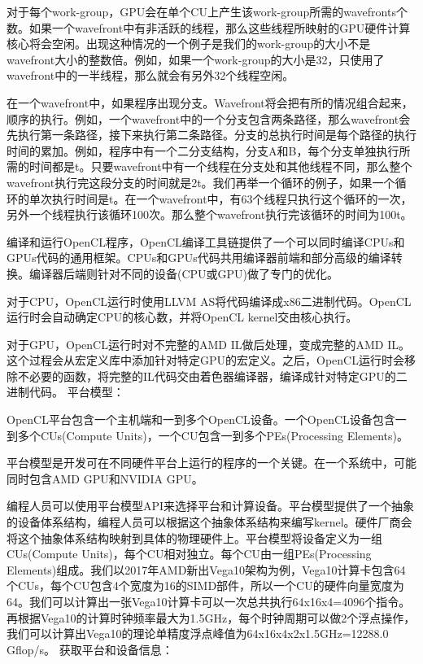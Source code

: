 对于每个work-group，GPU会在单个CU上产生该work-group所需的wavefronts个数。如果一个wavefront中有非活跃的线程，那么这些线程所映射的GPU硬件计算核心将会空闲。出现这种情况的一个例子是我们的work-group的大小不是wavefront大小的整数倍。例如，如果一个work-group的大小是32，只使用了wavefront中的一半线程，那么就会有另外32个线程空闲。

在一个wavefront中，如果程序出现分支。Wavefront将会把有所的情况组合起来，顺序的执行。例如，一个wavefront中的一个分支包含两条路径，那么wavefront会先执行第一条路径，接下来执行第二条路径。分支的总执行时间是每个路径的执行时间的累加。例如，程序中有一个二分支结构，分支A和B，每个分支单独执行所需的时间都是t。只要wavefront中有一个线程在分支处和其他线程不同，那么整个wavefront执行完这段分支的时间就是2t。我们再举一个循环的例子，如果一个循环的单次执行时间是t。在一个wavefront中，有63个线程只执行这个循环的一次，另外一个线程执行该循环100次。那么整个wavefront执行完该循环的时间为100t。

编译和运行OpenCL程序，OpenCL编译工具链提供了一个可以同时编译CPUs和GPUs代码的通用框架。CPUs和GPUs代码共用编译器前端和部分高级的编译转换。编译器后端则针对不同的设备(CPU或GPU)做了专门的优化。

对于CPU，OpenCL运行时使用LLVM AS将代码编译成x86二进制代码。OpenCL运行时会自动确定CPU的核心数，并将OpenCL kernel交由核心执行。

对于GPU，OpenCL运行时对不完整的AMD IL做后处理，变成完整的AMD IL。这个过程会从宏定义库中添加针对特定GPU的宏定义。之后，OpenCL运行时会移除不必要的函数，将完整的IL代码交由着色器编译器，编译成针对特定GPU的二进制代码。
平台模型：

OpenCL平台包含一个主机端和一到多个OpenCL设备。一个OpenCL设备包含一到多个CUs(Compute Units)，一个CU包含一到多个PEs(Processing Elements)。

平台模型是开发可在不同硬件平台上运行的程序的一个关键。在一个系统中，可能同时包含AMD GPU和NVIDIA GPU。

编程人员可以使用平台模型API来选择平台和计算设备。平台模型提供了一个抽象的设备体系结构，编程人员可以根据这个抽象体系结构来编写kernel。硬件厂商会将这个抽象体系结构映射到具体的物理硬件上。平台模型将设备定义为一组CUs(Compute Units)，每个CU相对独立。每个CU由一组PEs(Processing Elements)组成。我们以2017年AMD新出Vega10架构为例，Vega10计算卡包含64个CUs，每个CU包含4个宽度为16的SIMD部件，所以一个CU的硬件向量宽度为64。我们可以计算出一张Vega10计算卡可以一次总共执行64x16x4=4096个指令。再根据Vega10的计算时钟频率最大为1.5GHz，每个时钟周期可以做2个浮点操作，我们可以计算出Vega10的理论单精度浮点峰值为64x16x4x2x1.5GHz=12288.0 Gflop/s。
获取平台和设备信息：

